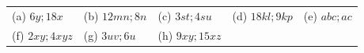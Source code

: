 {        
        \begin{center}
      \label{m39383*id268893}
    \noindent
      \tablelasttail{}
      \begin{xtabular*}{\mytablewidth}[t]{|p{10\mystarwidth}|p{10\mystarwidth}|p{10\mystarwidth}|p{10\mystarwidth}|p{10\mystarwidth}|}\hline
        (a) $6y;18x$ &
        (b) $12mn;8n$ &
        (c) $3st;4su$ &
        (d) $18kl;9kp$ &
        (e) $abc;ac$%
     \tabularnewline{}
        (f) $2xy;4xyz$\hspace{5ex} &
        (g) $3uv;6u$ &
        (h) $9xy;15xz$\hspace{5ex} &

\end{xtabular*}
\end{center}}
